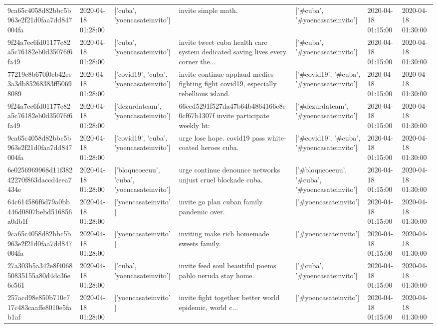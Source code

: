 \begin{tabular}{lllllll}
9ca65c4058d82bbc5b963e2f21d0faa7dd847004fa & 2020-04-18 01:28:00 & ['cuba', 'yoencasateinvito'] & invite simple math. & ['#cuba', '#yoencasateinvito'] & 2020-04-18 01:15:00 & 2020-04-18 01:30:00 \\
9f24a7ec6fd01177c82a5c76182eb0d35076f6fa49 & 2020-04-18 01:28:00 & ['cuba', 'yoencasateinvito'] & invite tweet cuba health care system dedicated saving lives every corner the... & ['#cuba', '#yoencasateinvito'] & 2020-04-18 01:15:00 & 2020-04-18 01:30:00 \\
77219c8b670f0cb42ee3a3db85268383ff50698089 & 2020-04-18 01:28:00 & ['covid19', 'cuba', 'yoencasateinvito'] & invite continue applaud medics fighting fight covid19, especially rebellious island. & ['#covid19', '#cuba', '#yoencasateinvito'] & 2020-04-18 01:15:00 & 2020-04-18 01:30:00 \\
9f24a7ec6fd01177c82a5c76182eb0d35076f6fa49 & 2020-04-18 01:28:00 & ['dezurdateam', 'yoencasateinvito'] & 66ced5291f527da47b64b4864166c8e0cf67b1307f invite participate weekly ht: & ['#dezurdateam', '#yoencasateinvito'] & 2020-04-18 01:15:00 & 2020-04-18 01:30:00 \\
9ca65c4058d82bbc5b963e2f21d0faa7dd847004fa & 2020-04-18 01:28:00 & ['covid19', 'cuba', 'yoencasateinvito'] & urge lose hope. covid19 pass white-coated heroes cuba. & ['#covid19', '#cuba', '#yoencasateinvito'] & 2020-04-18 01:15:00 & 2020-04-18 01:30:00 \\
6e0256969968d11f38242270f863daccd4eea7434e & 2020-04-18 01:28:00 & ['bloqueoeeuu', 'cuba', 'yoencasateinvito'] & urge continue denounce networks unjust cruel blockade cuba. & ['#bloqueoeeuu', '#cuba', '#yoencasateinvito'] & 2020-04-18 01:15:00 & 2020-04-18 01:30:00 \\
64c614586f6d79a0bb446d0807bebd516856a0db1f & 2020-04-18 01:28:00 & ['yoencasateinvito'] & invite go plan cuban family pandemic over. & ['#yoencasateinvito'] & 2020-04-18 01:15:00 & 2020-04-18 01:30:00 \\
9ca65c4058d82bbc5b963e2f21d0faa7dd847004fa & 2020-04-18 01:28:00 & ['yoencasateinvito'] & inviting make rich homemade sweets family. & ['#yoencasateinvito'] & 2020-04-18 01:15:00 & 2020-04-18 01:30:00 \\
27a303b5a342e8f406850835155a80d4dc36e6c561 & 2020-04-18 01:28:00 & ['cuba', 'yoencasateinvito'] & invite feed soul beautiful poems pablo neruda stay home. & ['#cuba', '#yoencasateinvito'] & 2020-04-18 01:15:00 & 2020-04-18 01:30:00 \\
257acd98e850b710c717c483caaffe8010e5fab1af & 2020-04-18 01:28:00 & ['yoencasateinvito'] & invite fight together better world epidemic, world c... & ['#yoencasateinvito'] & 2020-04-18 01:15:00 & 2020-04-18 01:30:00 \\

\end{tabular}
